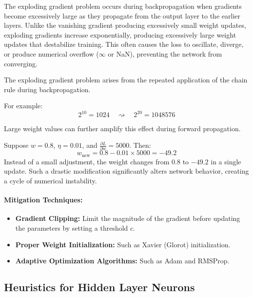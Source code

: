 The exploding gradient problem occurs during backpropagation when gradients become excessively large as they propagate from the output layer to the earlier layers. Unlike the vanishing gradient producing excessively small weight updates, exploding gradients increase exponentially, producing excessively large weight updates that destabilize training. This often causes the loss to oscillate, diverge, or produce numerical overflow ($\infty$ or NaN), preventing the network from converging.

The exploding gradient problem arises from the repeated application of the chain rule during backpropagation.

For example:
\begin{equation}
2^{10} = 1024 \quad \rightsquigarrow \quad 2^{20} = 1048576
\end{equation}

Large weight values can further amplify this effect during forward propagation.

\begin{examplebox}
Suppose $w = 0.8$, $\eta = 0.01$, and $\frac{\partial L}{\partial w} = 5000$. Then:
\begin{equation}
w_{\text{new}} = 0.8 - 0.01 \times 5000 = -49.2
\end{equation}
Instead of a small adjustment, the weight changes from $0.8$ to $-49.2$ in a single update. Such a drastic modification significantly alters network behavior, creating a cycle of numerical instability.
\end{examplebox}

\paragraph{Mitigation Techniques:}
\begin{itemize}
    \item \textbf{Gradient Clipping:} Limit the magnitude of the gradient before updating the parameters by setting a threshold $c$.
    \item \textbf{Proper Weight Initialization:} Such as Xavier (Glorot) initialization.
    \item \textbf{Adaptive Optimization Algorithms:} Such as Adam and RMSProp.
\end{itemize}

\subsection{Heuristics for Hidden Layer Neurons}

